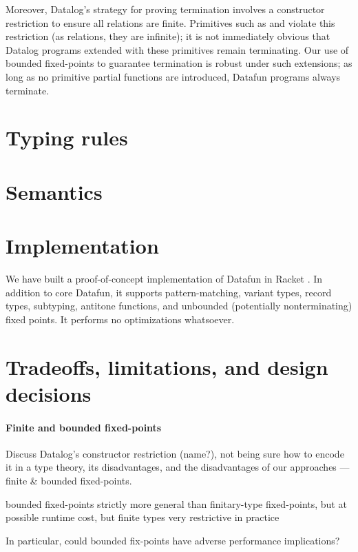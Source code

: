 \documentclass[preprint]{sigplanconf}
\begin{document}
\TODO Moreover, Datalog's strategy for proving termination involves a
constructor restriction to ensure all relations are finite. Primitives such as
 and  violate this restriction (as relations, they are
infinite); it is not immediately obvious that Datalog programs extended with
these primitives remain terminating. Our use of bounded fixed-points to
guarantee termination is robust under such extensions; as long as no primitive
partial functions are introduced, Datafun programs always terminate.


\section{Typing rules}

\section{Semantics}

\section{Implementation}
We have built a proof-of-concept implementation of Datafun in Racket
. In addition to core Datafun, it supports pattern-matching, variant
types, record types, subtyping, antitone functions, and unbounded (potentially
nonterminating) fixed points. It performs no optimizations whatsoever.


\section{Tradeoffs, limitations, and design decisions}

\paragraph{Finite and bounded fixed-points} \TODO Discuss
Datalog's constructor restriction (name?), not being sure how to encode it in a
type theory, its disadvantages, and the disadvantages of our approaches ---
finite \& bounded fixed-points.

bounded fixed-points strictly more general than finitary-type fixed-points, but
at possible runtime cost, but finite types very restrictive in practice

\TODO In particular, could bounded fix-points have adverse performance
implications?
\end{document}

